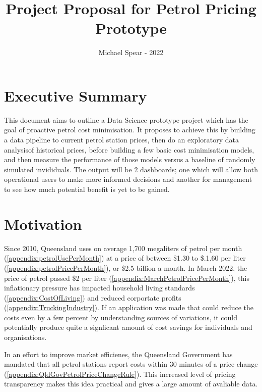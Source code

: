 \documentclass[10pt]{article} %
\title{Project Proposal for Petrol Pricing Prototype}
\author{Michael Spear - 2022}
\date{} %
\begin{document}
\maketitle
\section{Executive Summary}
This document aims to outline a Data Science prototype project which has the goal of proactive  petrol cost minimisation. It proposes to achieve this by building a data pipeline to current petrol station prices, then do an exploratory data analysisof historical prices, before building a few basic cost minimisation models, and then measure the performance of those models versus a baseline of randomly simulated invididuals. The output will be 2 dashboards; one which will allow both operational users to make more informed decisions and another for management to see how much potential benefit is yet to be gained.

\section{Motivation}
Since 2010, Queensland uses on average 1,700 megaliters of petrol per month (\ref{appendix:petrolUsePerMonth}) at a price of between \$1.30 to \$.1.60 per liter  (\ref{appendix:petrolPricePerMonth}), or \$2.5 billion a month. 
In March 2022, the price of petrol passed \$2 per liter  (\ref{appendix:MarchPetrolPricePerMonth}), this inflationary pressure has impacted household living standards (\ref{appendix:CostOfLiving}) and reduced corportate profits (\ref{appendix:TruckingIndustry}). 
If an application was made that could reduce the costs even by a few percent by understanding sources of variations, it could potentially produce quite a signficant amount of cost savings for individuals and organisations.

In an effort to improve market efficienes, the Queensland Government has mandated that all petrol stations report costs within 30 minutes of a price change  (\ref{appendix:QldGovPetrolPriceChangeRule}). This increased level of pricing transparency makes this idea practical and gives a large amount of avaliable data.
\end{document}
